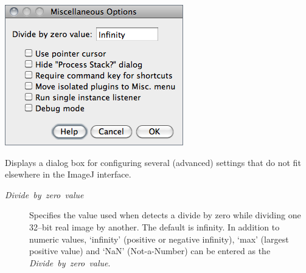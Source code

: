 \begin{minipage}[c][1\totalheight][t]{0.415\columnwidth}%
\includegraphics[scale=0.55]{images/Misc}%
\end{minipage}%
\begin{minipage}[c][1\totalheight][t]{0.585\columnwidth}%
Displays a dialog box for configuring several (advanced) settings
that do not fit elsewhere in the ImageJ interface. 
\begin{description}
\item [{\emph{Divide\ by\ zero\ value}}] Specifies the value used when
detects a divide by zero while dividing one 32--bit real image by
another. The default is infinity. In addition to numeric values, `infinity'
(positive or negative infinity), `max' (largest positive value)
and `NaN' (Not-a-Number) can be entered as the \emph{Divide\ by\ zero\ value}.\end{description}
%
\end{minipage}
